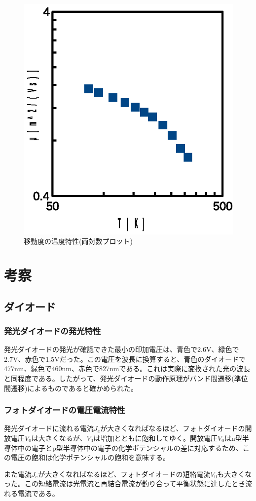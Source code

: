 \documentclass[11pt,a4]{jarticle}
\begin{document}
 \begin{figure}[!htbp]
   \begin{center}
    \includegraphics[width=0.4\hsize]{./T_mu_log.eps}
    \caption{移動度の温度特性(両対数プロット)}
     \label{fig:T_mu_log}
   \end{center}
\end{figure}

\section{考察}
\subsection{ダイオード}
\subsubsection{発光ダイオードの発光特性}
発光ダイオードの発光が確認できた最小の印加電圧は、青色で2.6V、緑色で2.7V、赤色で1.5Vだった。この電圧を波長に換算すると、青色のダイオードで477nm、緑色で460nm、赤色で827nmである。これは実際に変換された光の波長と同程度である。したがって、発光ダイオードの動作原理がバンド間遷移(準位間遷移)によるものであると確かめられた。

\subsubsection{フォトダイオードの電圧電流特性}
発光ダイオードに流れる電流$J_e$が大きくなればなるほど、フォトダイオードの開放電圧$V_0$は大きくなるが、$V_0$は増加とともに飽和してゆく。開放電圧$V_0$はn型半導体中の電子とp型半導体中の電子の化学ポテンシャルの差に対応するため、この電圧の飽和は化学ポテンシャルの飽和を意味する。

また電流$J_e$が大きくなればなるほど、フォトダイオードの短絡電流$V_0$も大きくなった。この短絡電流は光電流と再結合電流が釣り合って平衡状態に達したとき流れる電流である。
\end{document}
